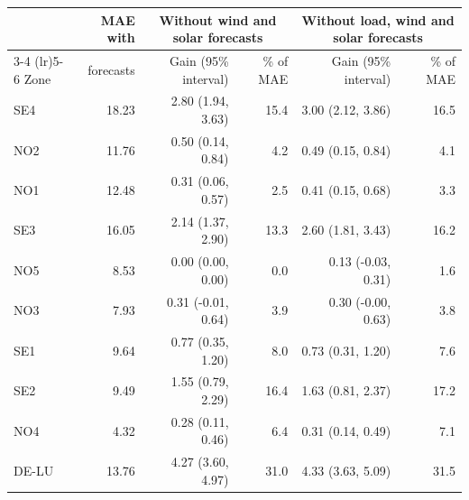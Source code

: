 \begin{tabular}{lrrrrr}
\toprule
 & MAE with & \multicolumn{2}{c}{Without wind and solar forecasts} & \multicolumn{2}{c}{Without load, wind and solar forecasts} \\
\cmidrule(lr){3-4} \cmidrule(lr){5-6}
Zone & forecasts & Gain (95\% interval) & \% of MAE & Gain (95\% interval) & \% of MAE \\
\midrule
SE4 & 18.23 & 2.80 (1.94, 3.63) & 15.4 & 3.00 (2.12, 3.86) & 16.5 \\
NO2 & 11.76 & 0.50 (0.14, 0.84) & 4.2 & 0.49 (0.15, 0.84) & 4.1 \\
NO1 & 12.48 & 0.31 (0.06, 0.57) & 2.5 & 0.41 (0.15, 0.68) & 3.3 \\
SE3 & 16.05 & 2.14 (1.37, 2.90) & 13.3 & 2.60 (1.81, 3.43) & 16.2 \\
NO5 & 8.53 & 0.00 (0.00, 0.00) & 0.0 & 0.13 (-0.03, 0.31) & 1.6 \\
NO3 & 7.93 & 0.31 (-0.01, 0.64) & 3.9 & 0.30 (-0.00, 0.63) & 3.8 \\
SE1 & 9.64 & 0.77 (0.35, 1.20) & 8.0 & 0.73 (0.31, 1.20) & 7.6 \\
SE2 & 9.49 & 1.55 (0.79, 2.29) & 16.4 & 1.63 (0.81, 2.37) & 17.2 \\
NO4 & 4.32 & 0.28 (0.11, 0.46) & 6.4 & 0.31 (0.14, 0.49) & 7.1 \\
DE-LU & 13.76 & 4.27 (3.60, 4.97) & 31.0 & 4.33 (3.63, 5.09) & 31.5 \\
\bottomrule
\end{tabular}
